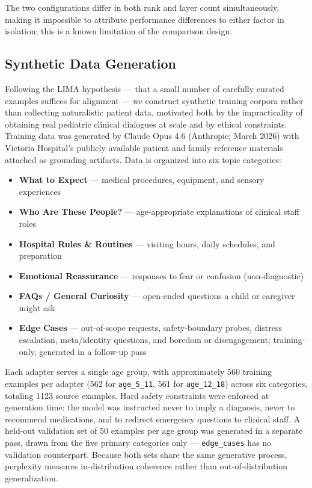 \documentclass[AMA,Times1COL]{WileyNJDv5} %
\begin{document}
The two configurations differ in both rank and layer count simultaneously, making it impossible to attribute performance differences to either factor in isolation; this is a known limitation of the comparison design.

\subsection{Synthetic Data Generation}

Following the LIMA hypothesis \cite{zhou2023lima} --- that a small number of carefully curated examples suffices for alignment --- we construct synthetic training corpora rather than collecting naturalistic patient data, motivated both by the impracticality of obtaining real pediatric clinical dialogues at scale and by ethical constraints. Training data was generated by Claude Opus 4.6 (Anthropic; March 2026) with Victoria Hospital's publicly available patient and family reference materials attached as grounding artifacts. Data is organized into six topic categories:

\begin{itemize}
    \item \textbf{What to Expect} --- medical procedures, equipment, and sensory experiences
    \item \textbf{Who Are These People?} --- age-appropriate explanations of clinical staff roles
    \item \textbf{Hospital Rules \& Routines} --- visiting hours, daily schedules, and preparation
    \item \textbf{Emotional Reassurance} --- responses to fear or confusion (non-diagnostic)
    \item \textbf{FAQs / General Curiosity} --- open-ended questions a child or caregiver might ask
    \item \textbf{Edge Cases} --- out-of-scope requests, safety-boundary probes, distress escalation, meta/identity questions, and boredom or disengagement; training-only, generated in a follow-up pass
\end{itemize}

Each adapter serves a single age group, with approximately 560 training examples per adapter (562 for \texttt{age\_5\_11}, 561 for \texttt{age\_12\_18}) across six categories, totaling 1123 source examples. Hard safety constraints were enforced at generation time: the model was instructed never to imply a diagnosis, never to recommend medications, and to redirect emergency questions to clinical staff. A held-out validation set of 50 examples per age group was generated in a separate pass, drawn from the five primary categories only --- \texttt{edge\_cases} has no validation counterpart. Because both sets share the same generative process, perplexity measures in-distribution coherence rather than out-of-distribution generalization.
\end{document}
